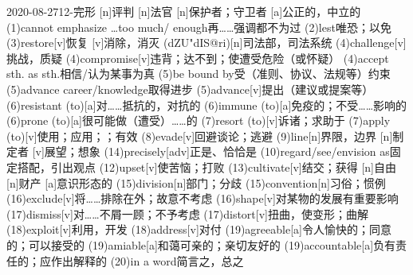 \documentclass[12pt]{ctexart}
\begin{document}
\begin{wordlist}{2020-08-27}{12-完形}
  [n]{评判}
  [n]{法官}
  [n]{保护者；守卫者}
  [a]{公正的，中立的}
  \word(1){cannot emphasize \dots too much/ enough}{再……强调都不为过}
  \word(2){lest}{唯恐；以免}
  \word[2020-09-11](3){restore}[v]{恢复}
  [v]{消除，消灭}
  (dZU"dIS@ri)[n]{司法部，司法系统}
  \word(4){challenge}[v]{挑战，质疑}
  \word[2020-11-02](4){compromise}[v]{违背；达不到；使遭受危险（或怀疑）}
  \word(4){accept sth. as sth.}{相信/认为某事为真}
  \word[2020-09-03](5){be bound by}{受（准则、协议、法规等）约束}
  \word(5){advance career/knowledge}{取得进步}
  \word[2020-09-21](5){advance}[v]{提出（建议或提案等）}
  \word(6){resistant (to)}[a]{对……抵抗的，对抗的}
  \word(6){immune (to)}[a]{免疫的；不受……影响的}
  \word[2020-08-29](6){prone (to)}[a]{很可能做（遭受）……的}
  \word(7){resort (to)}[v]{诉诸；求助于}
  \word(7){apply (to)}[v]{使用；应用；；有效}
  \word(8){evade}[v]{回避谈论；逃避}
  \word(9){line}[n]{界限，边界}
  [n]{制定者}
  [v]{展望；想象}
  \word(14){precisely}[adv]{正是、恰恰是}
  \word(10){regard/see/envision as}{固定搭配，引出观点}
  \word(12){upset}[v]{使苦恼；打败}
  \word(13){cultivate}[v]{结交；获得}
  [n]{自由}
  [n]{财产}
  [a]{意识形态的}
  \word(15){division}[n]{部门；分歧}
  \word(15){convention}[n]{习俗；惯例}
  \word(16){exclude}[v]{将……排除在外；故意不考虑}
  \word(16){shape}[v]{对某物的发展有重要影响}
  \word(17){dismiss}[v]{对……不屑一顾；不予考虑}
  \word[2020-08-29](17){distort}[v]{扭曲，使变形；曲解}
  \word[2020-08-29](18){exploit}[v]{利用，开发}
  \word(18){address}[v]{对付}
  \word(19){agreeable}[a]{令人愉快的；同意的；可以接受的}
  \word[2020-08-31](19){amiable}[a]{和蔼可亲的；亲切友好的}
  \word[2020-08-29](19){accountable}[a]{负有责任的；应作出解释的}
  \word(20){in a word}{简言之，总之}
\end{wordlist}
\end{document}
